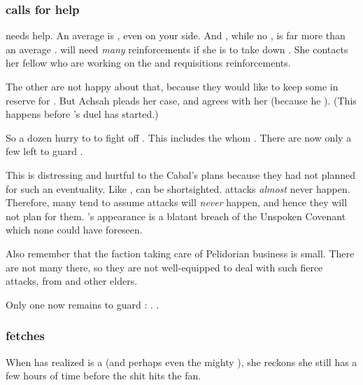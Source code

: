 \subsubsection{\Achsah calls for help}
\Achsah{} needs help. 
An average \dragon is , even  on your side.
And \Nzessuacrith, while no \shaeeroth, is far more than an average \dragon. 
\Achsah will need \emph{many} reinforcements if she is to take down \Nzessuacrith. 
She contacts her fellow \resphain who are working on the  and requisitions reinforcements. 

The other \resphain are not happy about that, because they would like to keep some in reserve for \Ishnaruchaefir.
But Achsah pleads her case, and \Teshrial agrees with her (because he ).
(This happens before \Teshrial's duel has started.)

So a dozen \resphain hurry to \Forclin to fight off \Nzessuacrith. 
This includes the \resphain{} whom \Teshrial{} . 
There are now only a few left to guard \Malcur. 

This is distressing and hurtful to the Cabal's plans because they had not planned for such an eventuality. 
Like \humans, \resphain can be shortsighted.
\Dragon attacks \emph{almost} never happen.
Therefore, many \resphain tend to assume \dragon attacks will \emph{never} happen, and hence they will not plan for them. 
\Nzessuacrith's appearance is a blatant breach of the Unspoken Covenant which none could have foreseen.

Also remember that the faction taking care of Pelidorian business is small. 
There are not many \resphain there, so they are not well-equipped to deal with such fierce \dragon attacks, from \shaeeroth and other elders.

Only one \resphan{} now remains to guard \Malcur: \Paerzim. 
. 





\subsubsection{\Achsah fetches \umbrae}
When \Achsah{} has realized \Takestsha{} is a \dragon{} (and perhaps even the mighty \Nzessuacrith), she reckons she still has a few hours of time before the shit hits the fan. 


